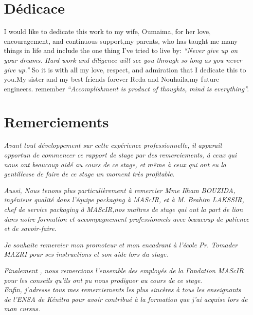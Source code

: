 \documentclass[11pt, a4paper, twoside]{book}
\author{Réalisé par : \\ Otmane BOUAYAD \vspace*{1truecm} \\ Encadré par : \\
\\Mme Tomader MAZRI : Encadrante Académique
\\ Mme Ilham BOUZIDA : Encadrante professionnelle\\ 
}
\date{(Du 15 Février au 25 Août  2016)}
\begin{document}
\maketitle
\pagestyle{plain}

\chapter*{Dédicace}

I would like to dedicate this work to my wife, Oumaima, for her love, encouragement, and continuous support,my parents, who has taught me many things in life and include the one thing I’ve tried to live by: 
\emph{“Never give up on your dreams. Hard work and diligence will see you through so long as you never give up.”}
 So it is with all my love, respect, and admiration that I dedicate this to you.My sister and my best friends forever Reda and Nouhaila,my future engineers. remember
\emph{“Accomplishment is product of thoughts, mind is everything”.}

\chapter*{Remerciements}
\emph{
Avant tout développement sur cette expérience professionnelle, il apparaît opportun 
de commencer ce rapport de stage par des remerciements, à ceux qui nous ont beaucoup 
aidé au cours de ce stage, et même à ceux qui ont eu la gentillesse de faire de ce stage un 
moment très profitable.\\}

\emph{
Aussi, Nous tenons plus particulièrement à remercier Mme Ilham
BOUZIDA, ingénieur qualité dans l’équipe packaging à MAScIR, et à M. Brahim LAKSSIR, chef de service packaging à MAScIR,nos maîtres de stage qui ont la part de lion dans notre formation et accompagnement professionnels avec beaucoup de patience et de savoir-faire.\\ }


\emph{Je souhaite remercier mon promoteur et mon encadrant à l'école Pr. Tomader MAZRI pour ses instructions et son aide lors du stage.\\}


\emph{
Finalement , nous remercions l'ensemble des employés de la Fondation MAScIR pour les conseils qu’ils ont pu nous prodiguer au cours de ce stage.
}\\


\emph{Enfin, j’adresse tous mes remerciements les plus sincères à tous les enseignants de l’ENSA de Kénitra pour avoir contribué à la formation que j’ai acquise lors de mon cursus.}
\tableofcontents
\end{document}
